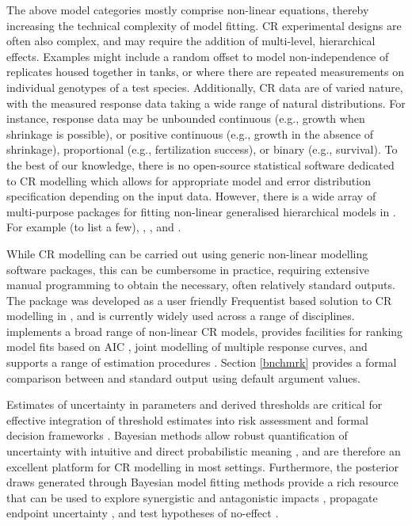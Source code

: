 \documentclass[
  shortnames]{jss}
\begin{document}
The above model categories mostly comprise non-linear equations, thereby increasing the technical complexity of model fitting. CR experimental designs are often also complex, and may require the addition of multi-level, hierarchical effects. Examples might include a random offset to model non-independence of replicates housed together in tanks, or where there are repeated measurements on individual genotypes of a test species. Additionally, CR data are of varied nature, with the measured response data taking a wide range of natural distributions. For instance, response data may be unbounded continuous (e.g., growth when shrinkage is possible), or positive continuous (e.g., growth in the absence of shrinkage), proportional (e.g., fertilization success), or binary (e.g., survival). To the best of our knowledge, there is no open-source statistical software dedicated to CR modelling which allows for appropriate model and error distribution specification depending on the input data. However, there is a wide array of multi-purpose packages for fitting non-linear generalised hierarchical models in . For example (to list a few),  \citep{pinheiro2021},  \citep{pinheiro2021},  \citep{Su2015} and  \citep{rstan2021}.

While CR modelling can be carried out using generic non-linear modelling software packages, this can be cumbersome in practice, requiring extensive manual programming to obtain the necessary, often relatively standard outputs. The  package \citep{Ritz2016} was developed as a user friendly Frequentist based solution to CR modelling in , and is currently widely used across a range of disciplines.  implements a broad range of non-linear CR models, provides facilities for ranking model fits based on AIC \citep{Burnham2002}, joint modelling of multiple response curves, and supports a range of estimation procedures \citep{Ritz2016}. Section \ref{bnchmrk} provides a formal comparison between  and  standard output using default argument values.

Estimates of uncertainty in parameters and derived thresholds are critical for effective integration of threshold estimates into risk assessment and formal decision frameworks \citep{fisher2018c}. Bayesian methods allow robust quantification of uncertainty with intuitive and direct probabilistic meaning \citep{Ellison1996}, and are therefore an excellent platform for CR modelling in most settings. Furthermore, the posterior draws generated through Bayesian model fitting methods provide a rich resource that can be used to explore synergistic and antagonistic impacts \citep{Fisher2019d, flores2021}, propagate endpoint uncertainty \citep{Charles2020a, Gottschalk2013}, and test hypotheses of no-effect \citep{Thomas2006}.
\end{document}
